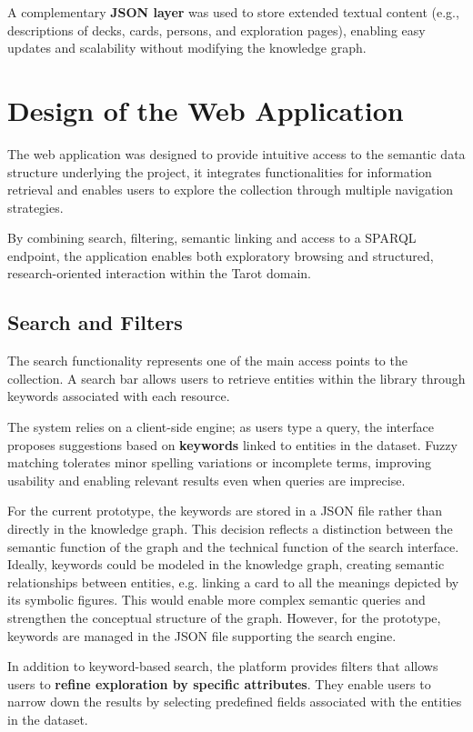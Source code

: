 \documentclass[11pt]{article}
\begin{document}
A complementary \textbf{JSON layer} was used to store extended textual content (e.g., descriptions of decks, cards, persons, and exploration pages), enabling easy updates and scalability without modifying the knowledge graph.

\section{Design of the Web Application}
The web application was designed to provide intuitive access to the semantic data structure underlying the project, it integrates functionalities for information retrieval and enables users to explore the collection through multiple navigation strategies.

By combining search, filtering, semantic linking and access to a SPARQL endpoint, the application enables both exploratory browsing and structured, research-oriented interaction within the Tarot domain.

\subsection{Search and Filters}
The search functionality represents one of the main access points to the collection. A search bar allows users to retrieve entities within the library through keywords associated with each resource.

The system relies on a client-side engine; as users type a query, the interface proposes suggestions based on \textbf{keywords} linked to entities in the dataset. Fuzzy matching tolerates minor spelling variations or incomplete terms, improving usability and enabling relevant results even when queries are imprecise.

For the current prototype, the keywords are stored in a JSON file rather than directly in the knowledge graph. This decision reflects a distinction between the semantic function of the graph and the technical function of the search interface. Ideally, keywords could be modeled in the knowledge graph, creating semantic relationships between entities, e.g. linking a card to all the meanings depicted by its symbolic figures. This would enable more complex semantic queries and strengthen the conceptual structure of the graph. However, for the prototype, keywords are managed in the JSON file supporting the search engine. 

In addition to keyword-based search, the platform provides filters that allows users to \textbf{refine exploration by specific attributes}. They enable users to narrow down the results by selecting predefined fields associated with the entities in the dataset.
\end{document}
